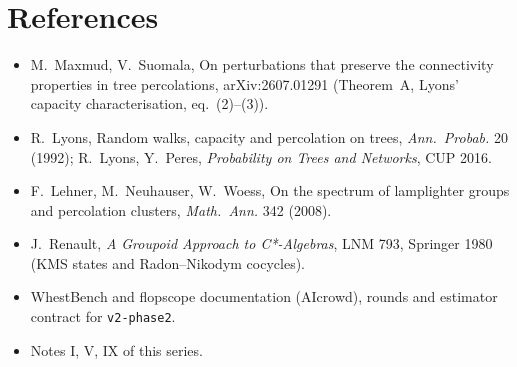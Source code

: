 \documentclass[11pt]{article}
\theoremstyle{definition}
\theoremstyle{remark}
\begin{document}
\section*{References}
\begin{itemize}\small
\item M.~Maxmud, V.~Suomala, On perturbations that preserve the connectivity properties in tree percolations, arXiv:2607.01291 (Theorem~A, Lyons' capacity characterisation, eq.~(2)--(3)).
\item R.~Lyons, Random walks, capacity and percolation on trees, \emph{Ann.\ Probab.} 20 (1992); R.~Lyons, Y.~Peres, \emph{Probability on Trees and Networks}, CUP 2016.
\item F.~Lehner, M.~Neuhauser, W.~Woess, On the spectrum of lamplighter groups and percolation clusters, \emph{Math.\ Ann.} 342 (2008).
\item J.~Renault, \emph{A Groupoid Approach to C*-Algebras}, LNM 793, Springer 1980 (KMS states and Radon--Nikodym cocycles).
\item WhestBench and flopscope documentation (AIcrowd), rounds and estimator contract for \texttt{v2-phase2}.
\item Notes I, V, IX of this series.
\end{itemize}
\end{document}
